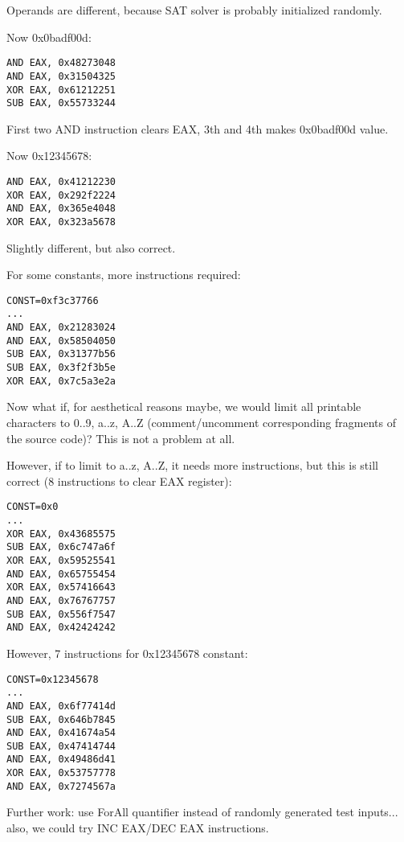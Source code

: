 Operands are different, because SAT solver is probably initialized randomly.

Now 0x0badf00d:

\begin{lstlisting}
AND EAX, 0x48273048
AND EAX, 0x31504325
XOR EAX, 0x61212251
SUB EAX, 0x55733244
\end{lstlisting}

First two AND instruction clears EAX, 3th and 4th makes 0x0badf00d value.

Now 0x12345678:

\begin{lstlisting}
AND EAX, 0x41212230
XOR EAX, 0x292f2224
AND EAX, 0x365e4048
XOR EAX, 0x323a5678
\end{lstlisting}

Slightly different, but also correct.

For some constants, more instructions required:

\begin{lstlisting}
CONST=0xf3c37766
...
AND EAX, 0x21283024
AND EAX, 0x58504050
SUB EAX, 0x31377b56
SUB EAX, 0x3f2f3b5e
XOR EAX, 0x7c5a3e2a
\end{lstlisting}

Now what if, for aesthetical reasons maybe, we would limit all printable characters to 0..9, a..z, A..Z (comment/uncomment
corresponding fragments of the source code)?
This is not a problem at all.

However, if to limit to a..z, A..Z, it needs more instructions, but this is still correct
(8 instructions to clear EAX register):

\begin{lstlisting}
CONST=0x0
...
XOR EAX, 0x43685575
SUB EAX, 0x6c747a6f
XOR EAX, 0x59525541
AND EAX, 0x65755454
XOR EAX, 0x57416643
AND EAX, 0x76767757
SUB EAX, 0x556f7547
AND EAX, 0x42424242
\end{lstlisting}

However, 7 instructions for 0x12345678 constant:

\begin{lstlisting}
CONST=0x12345678
...
AND EAX, 0x6f77414d
SUB EAX, 0x646b7845
AND EAX, 0x41674a54
SUB EAX, 0x47414744
AND EAX, 0x49486d41
XOR EAX, 0x53757778
AND EAX, 0x7274567a
\end{lstlisting}

Further work: use ForAll quantifier instead of randomly generated test inputs...
also, we could try INC EAX/DEC EAX instructions.

